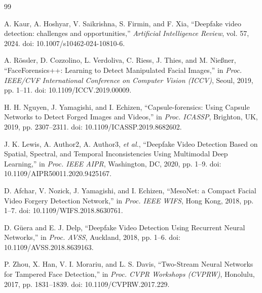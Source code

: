 
\begin{thebibliography}{99}

A. Kaur, A. Hoshyar, V. Saikrishna, S. Firmin, and F. Xia, ``Deepfake video detection: challenges and opportunities,'' \textit{Artificial Intelligence Review}, vol. 57, 2024. doi: 10.1007/s10462-024-10810-6.

A. R{\"o}ssler, D. Cozzolino, L. Verdoliva, C. Riess, J. Thies, and M. Nie{\ss}ner, ``FaceForensics++: Learning to Detect Manipulated Facial Images,'' in \textit{Proc. IEEE/CVF International Conference on Computer Vision (ICCV)}, Seoul, 2019, pp. 1--11. doi: 10.1109/ICCV.2019.00009.

H. H. Nguyen, J. Yamagishi, and I. Echizen, ``Capsule-forensics: Using Capsule Networks to Detect Forged Images and Videos,'' in \textit{Proc. ICASSP}, Brighton, UK, 2019, pp. 2307--2311. doi: 10.1109/ICASSP.2019.8682602.

J. K. Lewis, A. Author2, A. Author3, \textit{et al.}, ``Deepfake Video Detection Based on Spatial, Spectral, and Temporal Inconsistencies Using Multimodal Deep Learning,'' in \textit{Proc. IEEE AIPR}, Washington, DC, 2020, pp. 1--9. doi: 10.1109/AIPR50011.2020.9425167.

D. Afchar, V. Nozick, J. Yamagishi, and I. Echizen, ``MesoNet: a Compact Facial Video Forgery Detection Network,'' in \textit{Proc. IEEE WIFS}, Hong Kong, 2018, pp. 1--7. doi: 10.1109/WIFS.2018.8630761.

D. G{\"u}era and E. J. Delp, ``Deepfake Video Detection Using Recurrent Neural Networks,'' in \textit{Proc. AVSS}, Auckland, 2018, pp. 1--6. doi: 10.1109/AVSS.2018.8639163.

P. Zhou, X. Han, V. I. Morariu, and L. S. Davis, ``Two-Stream Neural Networks for Tampered Face Detection,'' in \textit{Proc. CVPR Workshops (CVPRW)}, Honolulu, 2017, pp. 1831--1839. doi: 10.1109/CVPRW.2017.229.


\end{thebibliography}
